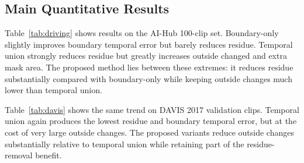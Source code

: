 \documentclass[nouppercase]{kaia}
\begin{document}
\subsection{Main Quantitative Results}
Table~\ref{tab:driving} shows results on the AI-Hub 100-clip set. Boundary-only slightly improves boundary temporal error but barely reduces residue. Temporal union strongly reduces residue but greatly increases outside changed and extra mask area. The proposed method lies between these extremes: it reduces residue substantially compared with boundary-only while keeping outside changes much lower than temporal union.

\begin{table}[h]
\begin{center}
\end{center}
\caption{Results on the AI-Hub 100-clip set. The proposed variants provide a trade-off between residue removal and over-removal suppression.}
\label{tab:driving}
\end{table}

Table~\ref{tab:davis} shows the same trend on DAVIS 2017 validation clips. Temporal union again produces the lowest residue and boundary temporal error, but at the cost of very large outside changes. The proposed variants reduce outside changes substantially relative to temporal union while retaining part of the residue-removal benefit.
\end{document}
